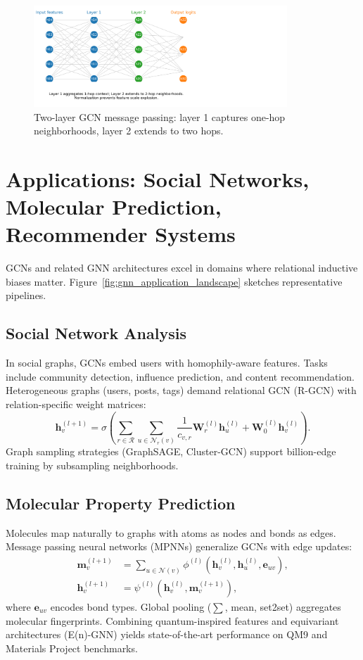 \documentclass{article}
\begin{document}
\begin{figure}[H]
  \centering
  \includegraphics[width=0.85\textwidth]{gcn_layer_flow.png}
  \caption{Two-layer GCN message passing: layer 1 captures one-hop neighborhoods, layer 2 extends to two hops.}
  \label{fig:gcn_layer_flow}
\end{figure}
\FloatBarrier

\section{Applications: Social Networks, Molecular Prediction, Recommender Systems}
GCNs and related GNN architectures excel in domains where relational inductive biases matter. Figure~\ref{fig:gnn_application_landscape} sketches representative pipelines.

\subsection{Social Network Analysis}
In social graphs, GCNs embed users with homophily-aware features. Tasks include community detection, influence prediction, and content recommendation. Heterogeneous graphs (users, posts, tags) demand relational GCN (R-GCN) with relation-specific weight matrices:
\begin{equation}
  \mathbf{h}_v^{(l+1)} = \sigma \left( \sum_{r \in \mathcal{R}} \sum_{u \in \mathcal{N}_r(v)} \frac{1}{c_{v,r}} \mathbf{W}_r^{(l)} \mathbf{h}_u^{(l)} + \mathbf{W}_0^{(l)} \mathbf{h}_v^{(l)} \right).
\end{equation}
Graph sampling strategies (GraphSAGE, Cluster-GCN) support billion-edge training by subsampling neighborhoods.

\subsection{Molecular Property Prediction}
Molecules map naturally to graphs with atoms as nodes and bonds as edges. Message passing neural networks (MPNNs) generalize GCNs with edge updates:
\begin{align}
  \mathbf{m}_v^{(l+1)} &= \sum_{u \in \mathcal{N}(v)} \phi^{(l)}\left(\mathbf{h}_v^{(l)}, \mathbf{h}_u^{(l)}, \mathbf{e}_{uv}\right), \\
  \mathbf{h}_v^{(l+1)} &= \psi^{(l)}\left(\mathbf{h}_v^{(l)}, \mathbf{m}_v^{(l+1)}\right),
\end{align}
where $\mathbf{e}_{uv}$ encodes bond types. Global pooling ($\sum$, mean, set2set) aggregates molecular fingerprints. Combining quantum-inspired features and equivariant architectures (E(n)-GNN) yields state-of-the-art performance on QM9 and Materials Project benchmarks.
\end{document}
